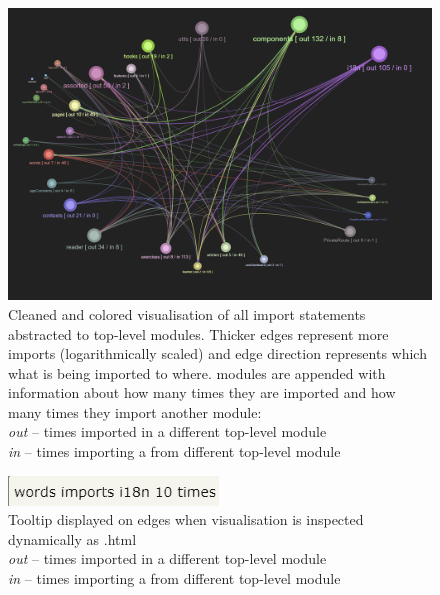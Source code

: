 \documentclass{article}
\begin{document}
\begin{figure}[h]
\includegraphics[width=\textwidth]{graphics/module_abstraction_cleaned.png}
\caption{Cleaned and colored visualisation of all import statements abstracted to top-level modules. 
Thicker edges represent more imports (logarithmically scaled) and edge 
direction represents which what is being imported to where.
modules are appended with information about how many times they are imported and how many times they import another module: \\
\hspace*{2em}\textit{out} -- times imported in a different top-level module \\
\hspace*{2em}\textit{in} -- times importing a from different top-level module}
\label{fig:d:clean}
\end{figure}

\begin{figure}[h]
\centering
\includegraphics[]{graphics/edge_tooltip.png}
\caption{Tooltip displayed on edges when visualisation is inspected dynamically as .html\\
\hspace*{2em}\textit{out} -- times imported in a different top-level module \\
\hspace*{2em}\textit{in} -- times importing a from different top-level module}
\label{fig:d:edgetooltip}
\end{figure}
\end{document}
